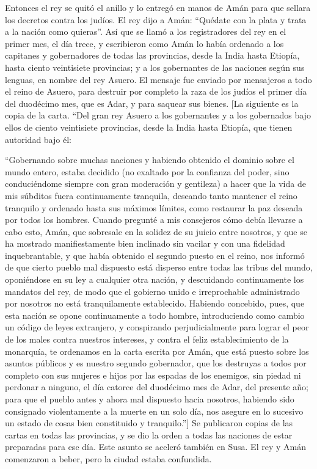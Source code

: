  Entonces el rey se quitó el anillo y lo entregó en manos
de Amán para que sellara los decretos contra los judíos. 
El rey dijo a Amán: ``Quédate con la plata y trata a la nación como
quieras''.  Así que se llamó a los registradores del rey
en el primer mes, el día trece, y escribieron como Amán lo había
ordenado a los capitanes y gobernadores de todas las provincias, desde
la India hasta Etiopía, hasta ciento veintisiete provincias; y a los
gobernantes de las naciones según sus lenguas, en nombre del rey Asuero.
 El mensaje fue enviado por mensajeros a todo el reino de
Asuero, para destruir por completo la raza de los judíos el primer día
del duodécimo mes, que es Adar, y para saquear sus bienes. {[}La
siguiente es la copia de la carta. ``Del gran rey Asuero a los
gobernantes y a los gobernados bajo ellos de ciento veintisiete
provincias, desde la India hasta Etiopía, que tienen autoridad bajo él:

``Gobernando sobre muchas naciones y habiendo obtenido el dominio sobre
el mundo entero, estaba decidido (no exaltado por la confianza del
poder, sino conduciéndome siempre con gran moderación y gentileza) a
hacer que la vida de mis súbditos fuera continuamente tranquila,
deseando tanto mantener el reino tranquilo y ordenado hasta sus máximos
límites, como restaurar la paz deseada por todos los hombres. Cuando
pregunté a mis consejeros cómo debía llevarse a cabo esto, Amán, que
sobresale en la solidez de su juicio entre nosotros, y que se ha
mostrado manifiestamente bien inclinado sin vacilar y con una fidelidad
inquebrantable, y que había obtenido el segundo puesto en el reino, nos
informó de que cierto pueblo mal dispuesto está disperso entre todas las
tribus del mundo, oponiéndose en su ley a cualquier otra nación, y
descuidando continuamente los mandatos del rey, de modo que el gobierno
unido e irreprochable administrado por nosotros no está tranquilamente
establecido. Habiendo concebido, pues, que esta nación se opone
continuamente a todo hombre, introduciendo como cambio un código de
leyes extranjero, y conspirando perjudicialmente para lograr el peor de
los males contra nuestros intereses, y contra el feliz establecimiento
de la monarquía, te ordenamos en la carta escrita por Amán, que está
puesto sobre los asuntos públicos y es nuestro segundo gobernador, que
los destruyas a todos por completo con sus mujeres e hijos por las
espadas de los enemigos, sin piedad ni perdonar a ninguno, el día
catorce del duodécimo mes de Adar, del presente año; para que el pueblo
antes y ahora mal dispuesto hacia nosotros, habiendo sido consignado
violentamente a la muerte en un solo día, nos asegure en lo sucesivo un
estado de cosas bien constituido y tranquilo.''{]}  Se
publicaron copias de las cartas en todas las provincias, y se dio la
orden a todas las naciones de estar preparadas para ese día.
 Este asunto se aceleró también en Susa. El rey y Amán
comenzaron a beber, pero la ciudad estaba confundida.

